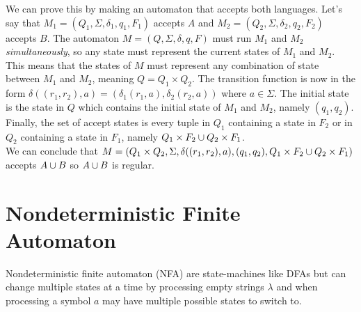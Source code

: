 \documentclass{article}
\newcommand{\emptyString}{\lambda}
\begin{document}
We can prove this by making an automaton that accepts both languages.
Let's say that \(M_1=(Q_1, \Sigma, \delta_1, q_1, F_1)\) accepts \(A\)
and \(M_2=(Q_2, \Sigma, \delta_2, q_2, F_2)\) accepts \(B\).
The automaton \(M=(Q, \Sigma, \delta, q, F)\) must run \(M_1\) and \(M_2\) \textit{simultaneously},
so any state must represent the current states of \(M_1\) and \(M_2\).
This means that the states of \(M\) must represent any combination of state between
\(M_1\) and \(M_2\), meaning \(Q=Q_1 \times Q_2\).
The transition function is now in the form
\(\delta((r_1, r_2), a) = (\delta_1(r_1, a), \delta_2(r_2, a))\) where \(a\in\Sigma\).
The initial state is the state in \(Q\) which contains the initial state of \(M_1\)
and \(M_2\), namely \((q_1, q_2)\). Finally, the set of accept states
is every tuple in \(Q_1\) containing a state in \(F_2\) or in \(Q_2\) containing a state in \(F_1\), namely
\(Q_1 \times F_2 \cup Q_2 \times F_1\). \\
We can conclude that \(M=(Q_1 \times Q_2, \Sigma, \delta((r_1, r_2), a), (q_1, q_2), Q_1 \times F_2 \cup Q_2 \times F_1)\)
accepts \(A \cup B\) so \(A \cup B\) is regular.

\pagebreak

\section{Nondeterministic Finite Automaton}

Nondeterministic finite automaton (NFA) are state-machines
like DFAs but can change multiple states at a time by processing
empty strings \(\emptyString\) and when processing a symbol
\(a\) may have multiple possible states to switch to.

\newcommand\double[3][10]{%
  \draw (#2)
    edge [bend left=#1,draw=none]
    coordinate[at start](#2-#3-s)
    coordinate[at end](#2-#3-e)
    (#3)
    edge [bend right=#1,draw=none]
    coordinate[at start](#3-#2-e)
    coordinate[at end](#3-#2-s)
    (#3);
}
\end{document}
